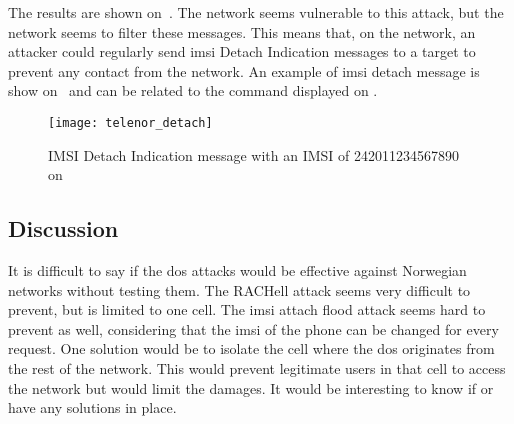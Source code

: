       The results are shown on~. The
       network seems vulnerable to this attack, but the
       network seems to filter these messages. This means
      that, on the  network, an attacker could regularly
      send \gls{imsi} Detach Indication messages to a target to prevent
      any contact from the network. An example of \gls{imsi} detach
      message is show on~ and can be related to
      the command displayed on .

      \begin{figure}[h]
        \centering
        \texttt{[image: telenor\_detach]}
        \caption{IMSI Detach Indication message with an IMSI of
        242011234567890 on }
        \label{fig:telenor_detach}
      \end{figure}


    \iffalse
    NEED TO TEST IMSI DETACH FROM TELENOR TO NETCOM ETC. SEE IF CAN
    DETACH PHONE IN OTHER COUNTRIES AND SO ON.

    The Location Updating Reject can reply either with
    Forbidden PLMN, or IMSI unknown in HLR. I do not know which value of
    the \gls{imsi} triggers the second one, but that's what we want.
    imsi detach as well
    \fi

      \iffalse
     It works well on telenor network but not on netcom's. This
    was tested with the telenor sim, the netcom sim, the proximus sim
    and the base sim. I guess that netcom filter these requests. This
    has a limited effect, as soon as the targeted phone contacts the
    network for any reason, it is removed. So when starting the phone
    again, the text message shows up.

    When starting the phone again, the text shows up.
    \fi

    \subsection{Discussion}

      It is difficult to say if the \gls{dos} attacks would be effective
      against Norwegian networks without testing them. The RACHell
      attack seems very difficult to prevent, but is limited to one
      cell. The \gls{imsi} attach flood attack seems hard to prevent as
      well, considering that the \gls{imsi} of the phone can be changed
      for every request. One solution would be to isolate the cell where
      the \gls{dos} originates from the rest of the network. This would
      prevent legitimate users in that cell to access the network but
      would limit the damages. It would be interesting to know if
       or  have any solutions in
      place.

